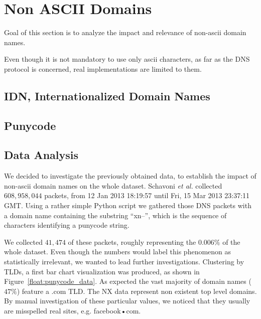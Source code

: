 \section{Non ASCII Domains}
\label{sec:non_ascii_domains}
Goal of this section is to analyze the impact and relevance of non-ascii domain names.

Even though it is not mandatory to use only ascii characters, as far as the DNS protocol is
concerned, real implementations are limited to them.


\subsection{IDN, Internationalized Domain Names} %
\label{sub:idn_internationalized_domain_names}



\subsection{Punycode} %
\label{sub:punycode}




\subsection{Data Analysis} %
\label{sub:data_analysis}

We decided to investigate the previously obtained data, to establish the impact of non-ascii
domain names on the whole dataset. Schavoni \emph{et al.} collected $608,958,044$ packets,
from 12 Jan 2013 18:19:57 until Fri, 15 Mar 2013 23:37:11 GMT. Using a rather simple Python
script we gathered those DNS packets with a domain name containing the substring ``xn--'', which
is the sequence of characters identifying a punycode string.

We collected $41,474$ of these packets, roughly representing the $0.006\%$ of the whole dataset.
Even though the numbers would label this phenomenon as statistically irrelevant, we wanted to
lead further investigations. Clustering by TLDs, a first bar chart visualization was
produced, as shown in Figure~\ref{float:punycode_data}. As expected the vast majority of domain
names ($47\%$) feature a .com TLD. The NX data represent non existent top level domains. By
manual investigation of these particular values, we noticed that they usually are misspelled
real sites, e.g. facebook•com.




